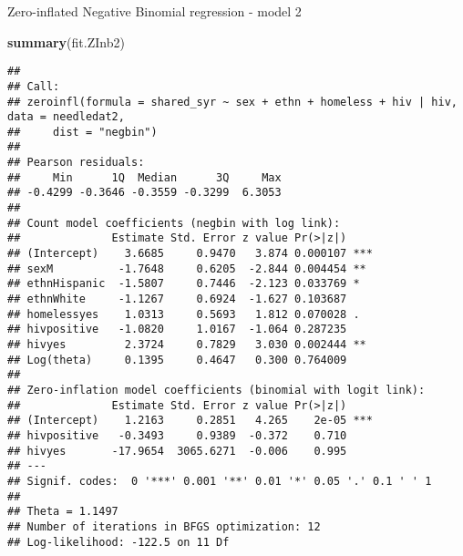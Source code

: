 \documentclass[
  ignorenonframetext,
]{beamer}
\newenvironment{Shaded}{\begin{snugshade}}{\end{snugshade}}
\newcommand{\KeywordTok}[1]{\textcolor[rgb]{0.13,0.29,0.53}{\textbf{#1}}}
\newcommand{\NormalTok}[1]{#1}
\begin{document}
\begin{frame}[fragile]{Zero-inflated Negative Binomial regression -
model 2}
\protect\hypertarget{zero-inflated-negative-binomial-regression---model-2}{}

\tiny

\begin{Shaded}
\begin{Highlighting}[]
\KeywordTok{summary}\NormalTok{(fit.ZInb2)}
\end{Highlighting}
\end{Shaded}

\begin{verbatim}
## 
## Call:
## zeroinfl(formula = shared_syr ~ sex + ethn + homeless + hiv | hiv, data = needledat2, 
##     dist = "negbin")
## 
## Pearson residuals:
##     Min      1Q  Median      3Q     Max 
## -0.4299 -0.3646 -0.3559 -0.3299  6.3053 
## 
## Count model coefficients (negbin with log link):
##              Estimate Std. Error z value Pr(>|z|)    
## (Intercept)    3.6685     0.9470   3.874 0.000107 ***
## sexM          -1.7648     0.6205  -2.844 0.004454 ** 
## ethnHispanic  -1.5807     0.7446  -2.123 0.033769 *  
## ethnWhite     -1.1267     0.6924  -1.627 0.103687    
## homelessyes    1.0313     0.5693   1.812 0.070028 .  
## hivpositive   -1.0820     1.0167  -1.064 0.287235    
## hivyes         2.3724     0.7829   3.030 0.002444 ** 
## Log(theta)     0.1395     0.4647   0.300 0.764009    
## 
## Zero-inflation model coefficients (binomial with logit link):
##              Estimate Std. Error z value Pr(>|z|)    
## (Intercept)    1.2163     0.2851   4.265    2e-05 ***
## hivpositive   -0.3493     0.9389  -0.372    0.710    
## hivyes       -17.9654  3065.6271  -0.006    0.995    
## ---
## Signif. codes:  0 '***' 0.001 '**' 0.01 '*' 0.05 '.' 0.1 ' ' 1 
## 
## Theta = 1.1497 
## Number of iterations in BFGS optimization: 12 
## Log-likelihood: -122.5 on 11 Df
\end{verbatim}

\end{frame}
\end{document}

